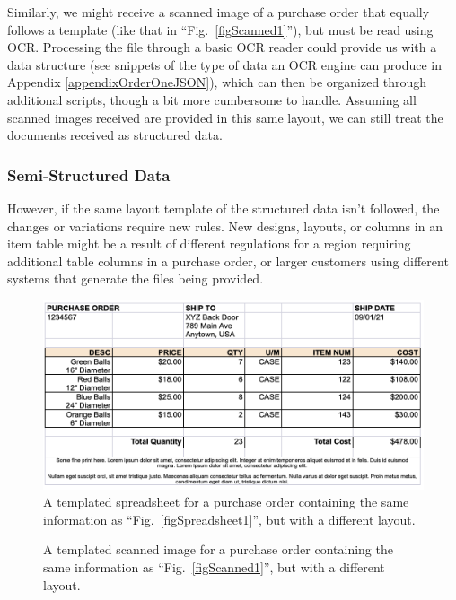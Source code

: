 \documentclass[conference]{IEEEtran}
\begin{document}
Similarly, we might receive a scanned image of a purchase order that equally follows a template (like that in ``Fig.~\ref{figScanned1}''), but must be read using OCR. Processing the file through a basic OCR reader could provide us with a data structure (see snippets of the type of data an OCR engine can produce in Appendix \ref{appendixOrderOneJSON}), which can then be organized through additional scripts, though a bit more cumbersome to handle. Assuming all scanned images received are provided in this same layout, we can still treat the documents received as structured data.

\subsubsection{Semi-Structured Data}
However, if the same layout template of the structured data isn't followed, the changes or variations require new rules. New designs, layouts, or columns in an item table might be a result of different regulations for a region requiring additional table columns in a purchase order, or larger customers using different systems that generate the files being provided.

\begin{figure}[ht]
\centerline{\includegraphics[width=\columnwidth]{Spreadsheet2.png}}
\caption{A templated spreadsheet for a purchase order containing the same information as ``Fig.~\ref{figSpreadsheet1}'', but with a different layout.}
\label{figSpreadsheet2}
\end{figure}

\begin{figure}[ht]
    \centerline{
}
\caption{A templated scanned image for a purchase order containing the same information as ``Fig.~\ref{figScanned1}'', but with a different layout.}
\label{figScanned2}
\end{figure}
\end{document}
